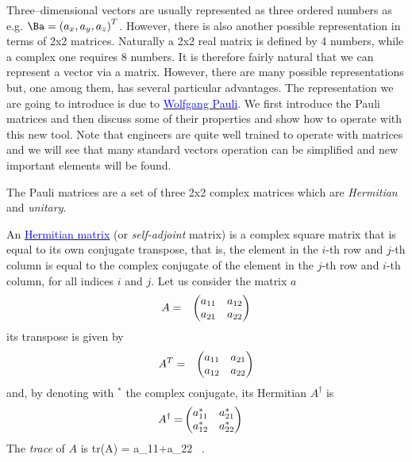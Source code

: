  Three--dimensional vectors are usually represented as three ordered numbers as e.g. $\Ba = \left(a_x, a_y, a_z\right)^T$. However, there is also another possible representation in terms of 2x2 matrices.
Naturally a 2x2 real matrix is defined by  4 numbers, while a complex one requires 8 numbers.
It is therefore fairly natural that we can represent a vector via a matrix. However, there are many possible representations but, one among them, has several particular advantages. The representation we are going to introduce is due to \href{https://en.wikipedia.org/wiki/Wolfgang_Pauli}{\textcolor{blue}{Wolfgang Pauli}}.
We first introduce the Pauli matrices and then discuss some of their properties and show how to operate with this new tool.
Note that engineers are quite well trained to operate with matrices and we will see that many standard vectors operation can be simplified and new important elements will be found.
 
 The Pauli matrices are a set of three 2x2 complex matrices which are \emph{Hermitian} and \emph{unitary}. 
 
 An \href{https://en.wikipedia.org/wiki/Hermitian_matrix}{\textcolor{blue}{Hermitian matrix}} (or \emph{self-adjoint} matrix) is a complex square matrix that is equal to its own conjugate transpose, that is, the element in the $i$-th row and $j$-th column is equal to the complex conjugate of the element in the $j$-th row and $i$-th column, for all indices $i$ and $j$.  Let us consider the matrix $a$
\begin{eqnarray}
A &= & \begin{pmatrix}a_{11} & a_{12}\cr a_{21} & a_{22}\end{pmatrix} \nonumber
\end{eqnarray}
%
its transpose is given by
%
\begin{eqnarray}
A^T&= & \begin{pmatrix}a_{11} & a_{21}\cr a_{12} & a_{22}\end{pmatrix} \nonumber
\end{eqnarray}
%
and, by denoting with $^*$ the complex conjugate, its Hermitian $A^\dag$ is
%
\begin{eqnarray}
A^\dag= & \begin{pmatrix}a_{11}^* & a_{21}^*\cr a_{12}^* & a_{22}^*\end{pmatrix} \nonumber
\end{eqnarray}
%
The \emph{trace} of $A$ is 
\be
tr(A) = a_{11}+a_{22} \, .
\ee
 
